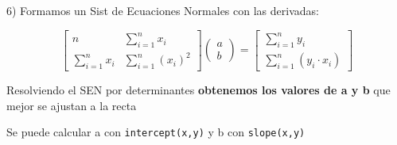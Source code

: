 \documentclass[10pt,a4paper]{article}
\begin{document}
6) Formamos un Sist de Ecuaciones Normales con las derivadas:

\begin{minipage}[t]{0.52\textwidth}
\vspace{0pt}
\[
\begin{bmatrix}
n & \displaystyle\sum_{i=1}^{n} x_i \\[6pt]
\displaystyle\sum_{i=1}^{n} x_i & \displaystyle\sum_{i=1}^{n} (x_i)^2
\end{bmatrix}
\begin{pmatrix} a \\ b \end{pmatrix}
=
\begin{bmatrix}
\displaystyle\sum_{i=1}^{n} y_i \\[6pt]
\displaystyle\sum_{i=1}^{n} (y_i\cdot x_i)
\end{bmatrix}
\]
\end{minipage}\hfill
\begin{minipage}[t]{0.44\textwidth}
\vspace{4pt}
{\small
Resolviendo el SEN por determinantes \textbf{obtenemos los valores de a y b} que mejor se ajustan a la recta

Se puede calcular a con \texttt{intercept(x,y)} y b con \texttt{slope(x,y)}
}
\end{minipage}
\end{document}

